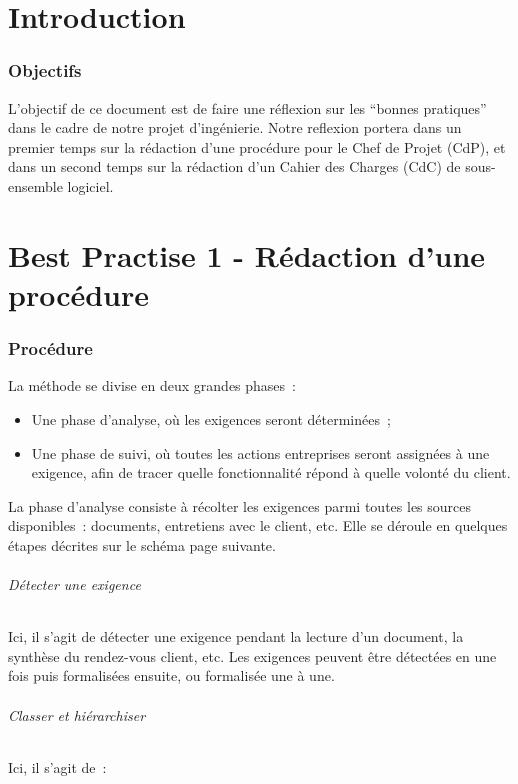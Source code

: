 \documentclass[a4paper]{article}
\begin{document}
\part{Introduction}

\section{Objectifs}

L'objectif de ce document est de faire une réflexion sur les ``bonnes pratiques'' dans le cadre de notre projet
d'ingénierie. Notre reflexion portera dans un premier temps sur la rédaction d'une procédure pour le Chef de Projet (CdP),
et dans un second temps sur la rédaction d'un Cahier des Charges (CdC) de sous-ensemble logiciel.

\part{Best Practise 1 - Rédaction d'une procédure}

\section{Procédure}


La méthode se divise en deux grandes phases :

\begin{itemize}
\item Une phase d’analyse, où les exigences seront déterminées ;
\item Une phase de suivi, où toutes les actions entreprises seront assignées à une exigence, afin de tracer quelle fonctionnalité répond à quelle volonté du client.
\end{itemize}

La phase d’analyse consiste à récolter les exigences parmi toutes les sources disponibles : documents, entretiens avec le client, etc. Elle se déroule en quelques étapes décrites sur le schéma page suivante.

\paragraph{Détecter une exigence}
Ici, il s’agit de détecter une exigence pendant la lecture d’un document, la synthèse du rendez-vous client, etc. Les exigences peuvent être détectées en une fois puis formalisées ensuite, ou formalisée une à une.

\paragraph{Classer et hiérarchiser}
Ici, il s’agit de :
\end{document}
